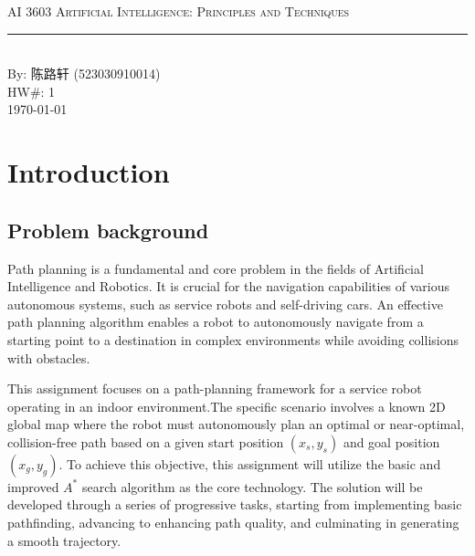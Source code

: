 \documentclass[aps,letterpaper,10pt]{revtex4}
\newcommand{\labtitle}{AI 3603 Artificial Intelligence: Principles and Techniques}
\newcommand{\authorname}{陈路轩 (523030910014)}
\newcommand{\hw}{1}
\begin{document}


\begin{titlepage}
\begin{center}
{\Large \textsc{\labtitle} \\ \vspace{4pt}}
\rule[13pt]{\textwidth}{1pt} \\ \vspace{150pt}
{\large By: \authorname \\ \vspace{10pt}
HW\#: \hw \\ \vspace{10pt}
\today}
\end{center}
\end{titlepage}





\section{Introduction}
\subsection{Problem background}
Path planning is a fundamental and core problem in the fields of Artificial Intelligence and Robotics. It is crucial for the navigation capabilities of various autonomous systems, such as service robots and self-driving cars. An effective path planning algorithm enables a robot to autonomously navigate from a starting point to a destination in complex environments while avoiding collisions with obstacles.

This assignment focuses on a path-planning framework for a service robot operating in an indoor environment.The specific scenario involves a known 2D global map where the robot must autonomously plan an optimal or near-optimal, collision-free path based on a given start position $(x_s, y_s)$ and goal position $(x_g, y_g)$. To achieve this objective, this assignment will utilize the basic and improved $A^*$ search algorithm as the core technology. The solution will be developed through a series of progressive tasks, starting from implementing basic pathfinding, advancing to enhancing path quality, and culminating in generating a smooth trajectory.
\end{document}
